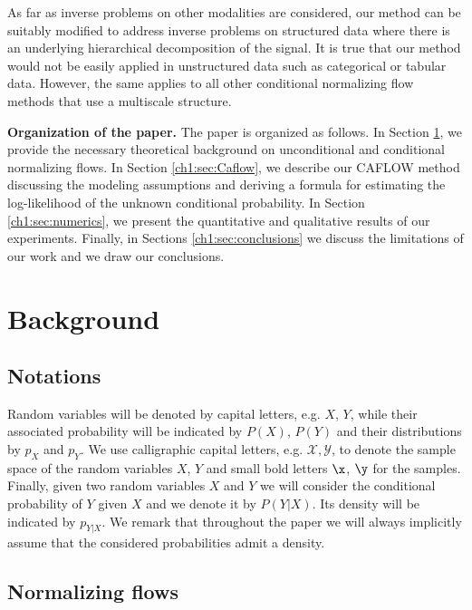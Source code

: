 As far as inverse problems on other modalities are considered, our method can be suitably modified to address inverse problems on structured data where there is an underlying hierarchical decomposition of the signal. It is true that our method would not be easily applied in unstructured data such as categorical or tabular data. However, the same applies to all other conditional normalizing flow methods that use a multiscale structure.
\color{black}

\medskip

\textbf{Organization of the paper.} The paper is organized as follows.
In Section \ref{ch1:sec:background}, we provide the necessary theoretical background on unconditional and conditional normalizing flows. In Section \ref{ch1:sec:Caflow}, we describe our CAFLOW method discussing the modeling assumptions and deriving a formula for estimating the log-likelihood of the unknown conditional probability. In Section \ref{ch1:sec:numerics}, we present the quantitative and qualitative results of our experiments. Finally, in Sections \ref{ch1:sec:conclusions} we discuss the limitations of our work and we draw our conclusions. 

\section{Background}\label{ch1:sec:background}

\subsection{Notations}

Random variables will be denoted by capital letters, e.g. $X$, $Y$, while their associated probability will be indicated by $P(X)$, $P(Y)$ and their distributions by $p_X$ and $p_Y$. 
We use calligraphic capital letters, e.g. $\mathcal{X}, \mathcal{Y}$, to denote the sample space of the random variables $X$, $Y$ and small bold letters $\x$, $\y$ for the samples. Finally, given two random variables $X$ and $Y$ we will consider the conditional probability of $Y$ given $X$ and we denote it by $P(Y|X)$. Its density will be indicated by $p_{Y|X}$. We remark that throughout the paper we will always implicitly assume that the considered probabilities admit a density.

\subsection{Normalizing flows}\label{ch1:subsec:normalizing}

